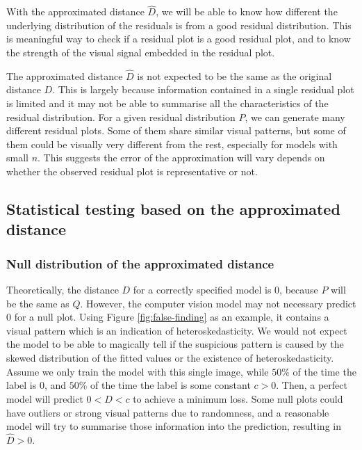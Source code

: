 \documentclass[]{interact}
\theoremstyle{plain}%
\theoremstyle{definition}
\theoremstyle{remark}
\begin{document}
With the approximated distance \(\hat{D}\), we will be able to know how
different the underlying distribution of the residuals is from a good
residual distribution. This is meaningful way to check if a residual
plot is a good residual plot, and to know the strength of the visual
signal embedded in the residual plot.

The approximated distance \(\hat{D}\) is not expected to be the same as
the original distance \(D\). This is largely because information
contained in a single residual plot is limited and it may not be able to
summarise all the characteristics of the residual distribution. For a
given residual distribution \(P\), we can generate many different
residual plots. Some of them share similar visual patterns, but some of
them could be visually very different from the rest, especially for
models with small \(n\). This suggests the error of the approximation
will vary depends on whether the observed residual plot is
representative or not.

\hypertarget{statistical-testing-based-on-the-approximated-distance}{%
\subsection{Statistical testing based on the approximated
distance}\label{statistical-testing-based-on-the-approximated-distance}}

\hypertarget{null-distribution-of-the-approximated-distance}{%
\subsubsection{Null distribution of the approximated
distance}\label{null-distribution-of-the-approximated-distance}}

Theoretically, the distance \(D\) for a correctly specified model is
\(0\), because \(P\) will be the same as \(Q\). However, the computer
vision model may not necessary predict \(0\) for a null plot. Using
Figure \ref{fig:false-finding} as an example, it contains a visual
pattern which is an indication of heteroskedasticity. We would not
expect the model to be able to magically tell if the suspicious pattern
is caused by the skewed distribution of the fitted values or the
existence of heteroskedasticity. Assume we only train the model with
this single image, while \(50\)\% of the time the label is \(0\), and
\(50\)\% of the time the label is some constant \(c > 0\). Then, a
perfect model will predict \(0 < \hat{D} < c\) to achieve a minimum
loss. Some null plots could have outliers or strong visual patterns due
to randomness, and a reasonable model will try to summarise those
information into the prediction, resulting in \(\hat{D} > 0\).
\end{document}
